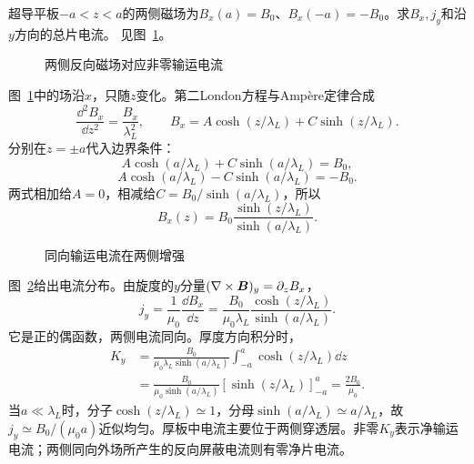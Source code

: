 \begin{exercise}[有输运电流的超导平板]\label{ex:i3-h6}
超导平板$-a<z<a$的两侧磁场为$B_x(a)=B_0$、$B_x(-a)=-B_0$。求$B_x,j_y$和沿$y$方向的总片电流。 见图~\ref{fig:i3-h6-q}。
\end{exercise}

\begin{figure}[H]\centering
{}
\caption{两侧反向磁场对应非零输运电流}\label{fig:i3-h6-q}
\end{figure}
\begin{solution}
图~\ref{fig:i3-h6-q}中的场沿$x$，只随$z$变化。第二London方程与Ampère定律合成
\[
\frac{\dd^2B_x}{\dd z^2}=\frac{B_x}{\lambda_L^2},\qquad
B_x=A\cosh(z/\lambda_L)+C\sinh(z/\lambda_L).
\]
分别在$z=\pm a$代入边界条件：
\[
A\cosh(a/\lambda_L)+C\sinh(a/\lambda_L)=B_0,
\]
\[
A\cosh(a/\lambda_L)-C\sinh(a/\lambda_L)=-B_0.
\]
两式相加给$A=0$，相减给$C=B_0/\sinh(a/\lambda_L)$，所以
\[
\boxed{B_x(z)=B_0\frac{\sinh(z/\lambda_L)}{\sinh(a/\lambda_L)}}.
\]
\begin{figure}[H]\centering
{}
\caption{同向输运电流在两侧增强}\label{fig:i3-h6-s}
\end{figure}
图~\ref{fig:i3-h6-s}给出电流分布。由旋度的$y$分量$(\nabla\times\bm{B})_y=\partial_zB_x$，
\[
j_y=\frac1{\mu_0}\frac{\dd B_x}{\dd z}
=\frac{B_0}{\mu_0\lambda_L}
\frac{\cosh(z/\lambda_L)}{\sinh(a/\lambda_L)}.
\]
它是正的偶函数，两侧电流同向。厚度方向积分时，
\[
\begin{aligned}
K_y&=\frac{B_0}{\mu_0\lambda_L\sinh(a/\lambda_L)}
\int_{-a}^a\cosh(z/\lambda_L)\dd z\\
&=\frac{B_0}{\mu_0\sinh(a/\lambda_L)}
[\sinh(z/\lambda_L)]_{-a}^a
=\boxed{\frac{2B_0}{\mu_0}}.
\end{aligned}
\]
当$a\ll\lambda_L$时，分子$\cosh(z/\lambda_L)\simeq1$，分母$\sinh(a/\lambda_L)\simeq a/\lambda_L$，故$j_y\simeq B_0/(\mu_0a)$近似均匀。厚板中电流主要位于两侧穿透层。非零$K_y$表示净输运电流；两侧同向外场所产生的反向屏蔽电流则有零净片电流。
\end{solution}

